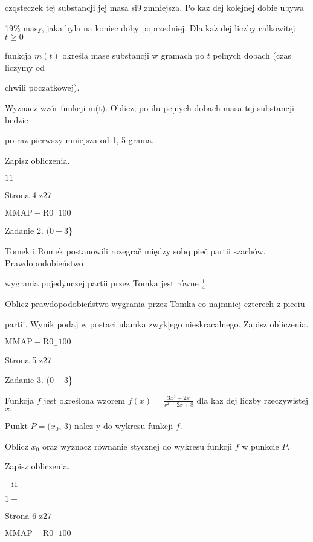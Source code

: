 \documentclass[a4paper,12pt]{article}
\begin{document}
czqsteczek tej substancji jej masa si9 zmniejsza. Po $\mathrm{k}\mathrm{a}\dot{\mathrm{z}}$ dej kolejnej dobie ubywa

19\% masy, jaka byla na koniec doby poprzedniej. Dla $\mathrm{k}\mathrm{a}\dot{\mathrm{z}}$ dej liczby calkowitej $t\geq 0$

funkcja $m(t)$ określa mase substancji w gramach po $t$ pelnych dobach (czas liczymy od

chwili poczatkowej).

Wyznacz wzór funkcji m(t). Oblicz, po ilu pe[nych dobach masa tej substancji bedzie

po raz pierwszy mniejsza od 1, 5 grama.

Zapisz obliczenia.

$1 1$

Strona 4 z27

$\mathrm{M}\mathrm{M}\mathrm{A}\mathrm{P}-\mathrm{R}0_{-}100$





Zadanie 2. $(0-3$\}

Tomek i Romek postanowili rozegrač między sobq pieč partii szachów. Prawdopodobieństwo

wygrania pojedynczej partii przez Tomka jest równe $\displaystyle \frac{1}{4}.$

Oblicz prawdopodobieństwo wygrania przez Tomka co najmniej czterech z pieciu

partii. Wynik podaj w postaci ulamka zwyk[ego nieskracalnego. Zapisz obliczenia.

$\mathrm{M}\mathrm{M}\mathrm{A}\mathrm{P}-\mathrm{R}0_{-}100$

Strona 5 z27





Zadanie 3. $(0-3$\}

Funkcja $f$ jest określona wzorem $f(x)=\displaystyle \frac{3x^{2}-2x}{x^{2}+2x+8}$ dla $\mathrm{k}\mathrm{a}\dot{\mathrm{z}}$ dej liczby rzeczywistej $x.$

Punkt $P=(x_{0}$, 3$)$ nalez $\mathrm{y}$ do wykresu funkcji $f.$

Oblicz $x_{0}$ oraz wyznacz równanie stycznej do wykresu funkcji $f$ w punkcie $P.$

Zapisz obliczenia.

$-\mathrm{i}1$

$1 -$

Strona 6 z27

$\mathrm{M}\mathrm{M}\mathrm{A}\mathrm{P}-\mathrm{R}0_{-}100$
\end{document}
